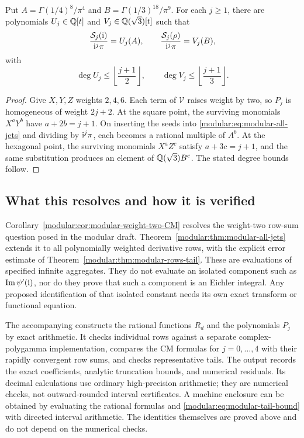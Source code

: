 \begin{corollary}
\label{modular:cor:modular-CM-degree}
Put
\(A=\Gamma(1/4)^8/\pi^4\) and
\(B=\Gamma(1/3)^{18}/\pi^9\). For each \(j\ge1\), there are
polynomials \(U_j\in\mathbb{Q}[t]\) and
\(V_j\in\mathbb{Q}(\sqrt3)[t]\) such that
\[
\frac{\mathcal S_j(\mathrm{i})}{\mathrm{i}^j\pi}=U_j(A),\qquad
\frac{\mathcal S_j(\rho)}{\mathrm{i}^j\pi}=V_j(B),
\]
with
\[
\deg U_j\le\left\lfloor\frac{j+1}{2}\right\rfloor,
\qquad
\deg V_j\le\left\lfloor\frac{j+1}{3}\right\rfloor.
\]
\end{corollary}
\begin{proof}
Give \(X,Y,Z\) weights \(2,4,6\). Each term of
\(\mathcal V\) raises weight by two, so \(P_j\) is homogeneous
of weight \(2j+2\). At the square point, the surviving monomials
\(X^aY^b\) have \(a+2b=j+1\). On inserting the seeds into
\eqref{modular:eq:modular-all-jets} and dividing by \(\mathrm{i}^j\pi\), each
becomes a rational multiple of \(A^b\). At the hexagonal point,
the surviving monomials \(X^aZ^c\) satisfy \(a+3c=j+1\), and
the same substitution produces an element of
\(\mathbb{Q}(\sqrt3)B^c\). The stated degree bounds follow.
\end{proof}

\subsection{What this resolves and how it is verified}

Corollary~\ref{modular:cor:modular-weight-two-CM} resolves the weight-two
row-sum question posed in the modular draft. Theorem~\ref{modular:thm:modular-all-jets}
extends it to all polynomially weighted derivative rows, with the
explicit error estimate of Theorem~\ref{modular:thm:modular-rows-tail}.
These are evaluations of specified infinite aggregates. They do not
evaluate an isolated component such as \(\operatorname{Im}\psi'(\mathrm{i})\), nor
do they prove that such a component is an Eichler integral. Any proposed
identification of that isolated constant needs its own exact transform
or functional equation.

The accompanying  constructs the rational
functions \(R_d\) and the polynomials \(P_j\) by exact arithmetic.
It checks individual rows against a separate complex-polygamma
implementation, compares the CM formulas for \(j=0,\ldots,4\) with
their rapidly convergent row sums, and checks representative tails.
The output  records the exact coefficients,
analytic truncation bounds, and numerical residuals. Its decimal
calculations use ordinary high-precision arithmetic; they are numerical
checks, not outward-rounded interval certificates. A machine enclosure
can be obtained by evaluating the rational formulas and
\eqref{modular:eq:modular-tail-bound} with directed interval arithmetic. The
identities themselves are proved above and do not depend on the
numerical checks.

